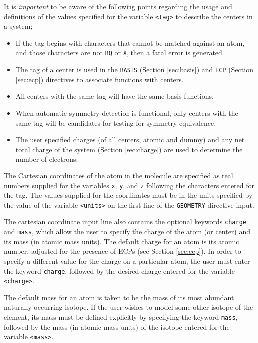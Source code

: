 It is {\em important} to be aware of the following points regarding the
usage and definitions of the values specified for the variable \verb+<tag>+
to describe the centers in a system;
\begin{itemize}
\item If the tag begins with characters that cannot be
  matched against an atom, and those characters are not \verb+BQ+ 
  or \verb+X+, then a fatal
  error is generated.
\item The tag of a center is used in the \verb+BASIS+ (Section
  \ref{sec:basis}) and \verb+ECP+ (Section \ref{sec:ecp}) directives
  to associate functions with centers.
\item All centers with the same tag will have the same basis
  functions.
\item When automatic symmetry detection is functional, only centers
  with the same tag will be candidates for testing for symmetry
  equivalence.
\item The user specified charges (of all centers, atomic and dummy)
  and any net total charge of the system (Section \ref{sec:charge}) are
  used to determine the number of electrons.
\end{itemize}

The Cartesian coordinates of the atom in the molecule are specified as
real numbers supplied for the variables \verb+x+, \verb+y+, and \verb+z+
following the characters entered for the tag.
The values supplied for the coordinates must be in the units specified
by the value of the variable \verb+<units>+ on the first line of
the \verb+GEOMETRY+ directive input.

The cartesian coordinate input line also contains the optional
keywords \verb+charge+ and \verb+mass+, which allow the user to
specify the charge of the atom (or center) and its mass (in atomic
mass units).  The default charge for an atom is its atomic number,
adjusted for the presence of ECPs (see Section \ref{sec:ecp}).  In
order to specify a different value for the charge on a particular
atom, the user must enter the keyword \verb+charge+, followed by the
desired charge entered for the variable \verb+<charge>+.

The default mass for an atom is taken to be the mass of its most
abundant naturally occurring isotope.  If the user wishes to model
some other isotope of the element, its mass must be defined explicitly
by specifying the keyword \verb+mass+, followed by the mass (in atomic
mass units) of the isotope entered for the variable \verb+<mass>+.

